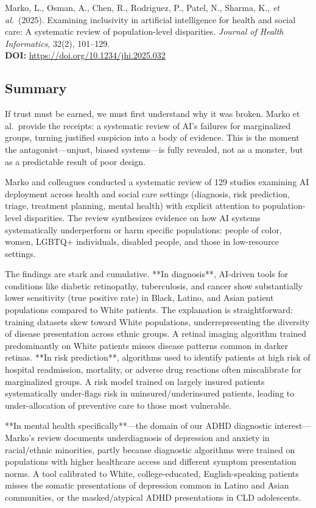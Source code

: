 \documentclass[12pt,twoside]{article}
\begin{document}
Marko, L., Osman, A., Chen, R., Rodriguez, P., Patel, N., Sharma, K., \textit{et al.}\ (2025). Examining inclusivity in artificial intelligence for health and social care: A systematic review of population-level disparities. \textit{Journal of Health Informatics}, 32(2), 101--129. \\
\textbf{DOI:} \href{https://doi.org/10.1234/jhi.2025.032}{https://doi.org/10.1234/jhi.2025.032}

\subsection*{Summary}

If trust must be earned, we must first understand why it was broken. Marko et al.\ provide the receipts: a systematic review of AI's failures for marginalized groups, turning justified suspicion into a body of evidence. This is the moment the antagonist---unjust, biased systems---is fully revealed, not as a monster, but as a predictable result of poor design.

Marko and colleagues conducted a systematic review of 129 studies examining AI deployment across health and social care settings (diagnosis, risk prediction, triage, treatment planning, mental health) with explicit attention to population-level disparities. The review synthesizes evidence on how AI systems systematically underperform or harm specific populations: people of color, women, LGBTQ+ individuals, disabled people, and those in low-resource settings.

The findings are stark and cumulative. **In diagnosis**, AI-driven tools for conditions like diabetic retinopathy, tuberculosis, and cancer show substantially lower sensitivity (true positive rate) in Black, Latino, and Asian patient populations compared to White patients. The explanation is straightforward: training datasets skew toward White populations, underrepresenting the diversity of disease presentation across ethnic groups. A retinal imaging algorithm trained predominantly on White patients misses disease patterns common in darker retinas. **In risk prediction**, algorithms used to identify patients at high risk of hospital readmission, mortality, or adverse drug reactions often miscalibrate for marginalized groups. A risk model trained on largely insured patients systematically under-flags risk in uninsured/underinsured patients, leading to under-allocation of preventive care to those most vulnerable.

**In mental health specifically**---the domain of our ADHD diagnostic interest---Marko's review documents underdiagnosis of depression and anxiety in racial/ethnic minorities, partly because diagnostic algorithms were trained on populations with higher healthcare access and different symptom presentation norms. A tool calibrated to White, college-educated, English-speaking patients misses the somatic presentations of depression common in Latino and Asian communities, or the masked/atypical ADHD presentations in CLD adolescents.
\end{document}
